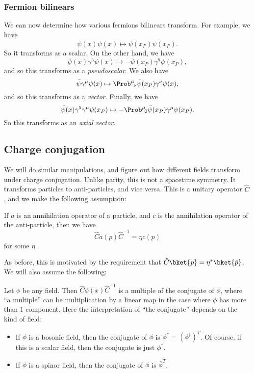 \documentclass[a4paper]{article}
\begin{document}
\subsubsection*{Fermion bilinears}
We can now determine how various fermions bilinears transform. For example, we have
\[
  \bar\psi(x) \psi(x) \mapsto \bar\psi(x_P) \psi(x_P).
\]
So it transforms as a scalar. On the other hand, we have
\[
  \bar\psi(x) \gamma^5 \psi(x) \mapsto - \bar{\psi}(x_P) \gamma^5 \psi(x_P),
\]
and so this transforms as a \emph{pseudoscalar}. We also have
\[
  \bar\psi \gamma^\mu \psi(x) \mapsto \Prob^\mu\!_\nu \bar\psi(x_P) \gamma^\nu \psi(x),
\]
and so this transforms as a \emph{vector}. Finally, we have
\[
  \bar\psi(x) \gamma^5 \gamma^\mu \psi(x_P) \mapsto - \Prob^\mu\!_0 \bar\psi(x_P) \gamma^\mu \psi(x_P).
\]
So this transforms as an \emph{axial vector}.
\subsection{Charge conjugation}
We will do similar manipulations, and figure out how different fields transform under charge conjugation. Unlike parity, this is not a spacetime symmetry. It transforms particles to anti-particles, and vice versa. This is a unitary operator $\hat{C}$, and we make the following assumption:

\begin{assumption}
  If $a$ is an annihilation operator of a particle, and $c$ is the annihilation operator of the anti-particle, then we have
  \[
    \hat{C} a(p)\hat{C}^{-1} = \eta c(p)
  \]
  for some $\eta$.
\end{assumption}

As before, this is motivated by the requirement that $\hat{C} \bket{p} = \eta^* \bket{\bar{p}}$. We will also assume the following:
\begin{assumption}
  Let $\phi$ be any field. Then $\hat{C} \phi(x) \hat{C}^{-1}$ is a multiple of the conjugate of $\phi$, where ``a multiple'' can be multiplication by a linear map in the case where $\phi$ has more than $1$ component. Here the interpretation of ``the conjugate'' depends on the kind of field:
  \begin{itemize}
    \item If $\phi$ is a bosonic field, then the conjugate of $\phi$ is $\phi^* = (\phi^\dagger)^T$. Of course, if this is a scalar field, then the conjugate is just $\phi^\dagger$.
    \item If $\phi$ is a spinor field, then the conjugate of $\phi$ is $\bar{\phi}^T$.
  \end{itemize}
\end{assumption}
\end{document}
